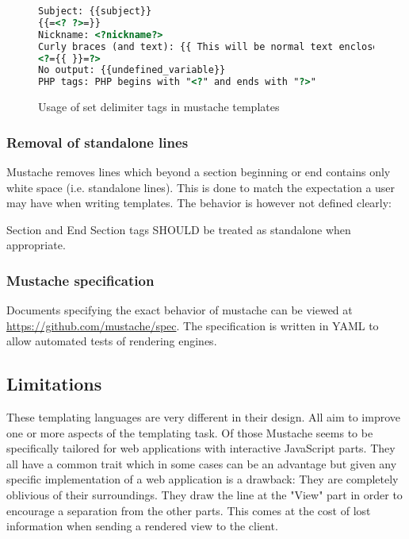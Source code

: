 \documentclass[thesis.tex]{subfiles}
\begin{document}
\begin{figure}
	\centering
	\begin{lstlisting}[language=HTML]
Subject: {{subject}}
{{=<? ?>=}}
Nickname: <?nickname?>
Curly braces (and text): {{ This will be normal text enclosed by curly braces }}
<?={{ }}=?>
No output: {{undefined_variable}}
PHP tags: PHP begins with "<?" and ends with "?>"
	\end{lstlisting}
	\caption{Usage of set delimiter tags in mustache templates}
	\label{fig:set-delim.mustache}
\end{figure}

\subsubsection{Removal of standalone lines}
\label{sec:standalone-lines}
Mustache removes lines which beyond a section beginning or end contains
only white space (i.e. standalone lines).
This is done to match the expectation a user may have when writing templates.
The behavior is however not defined clearly:
\begin{citequote}{\cite[sections.yml]{MSTSPEC}}
	Section and End Section tags SHOULD be treated as standalone when
	appropriate. 
\end{citequote}

\subsubsection{Mustache specification}
Documents specifying the exact behavior of mustache can be viewed at
\url{https://github.com/mustache/spec}. The specification is written in YAML to
allow automated tests of rendering engines.

\subsection{Limitations}
These templating languages are very different in their design.
All aim to improve one or more aspects of the templating task.
Of those Mustache seems to be specifically tailored for web applications
with interactive JavaScript parts.
They all have a common trait which in some cases can be an advantage
but given any specific implementation of a web application is a drawback:
They are completely oblivious of their surroundings. They draw the line
at the "View" part in order to encourage a separation from the other
parts. This comes at the cost of lost information when sending a
rendered view to the client.
\end{document}
